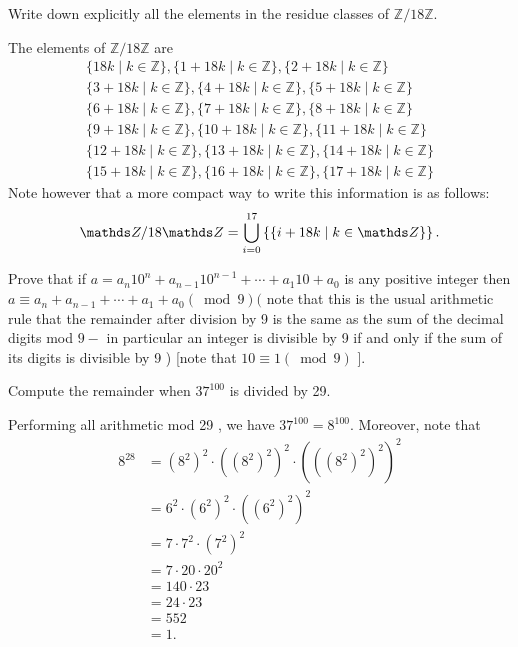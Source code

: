 \begin{questions}
\question
    Write down explicitly all the elements in the residue classes of \(\mathbb{Z} / 18 \mathbb{Z}\).
\begin{solution} The elements of \(\mathbb{Z} / 18 \mathbb{Z}\) are 
    $$\begin{gathered}
        \{18 k \mid k \in \mathbb{Z}\},\{1+18 k \mid k \in \mathbb{Z}\},\{2+18 k \mid k \in \mathbb{Z}\} \\
        \{3+18 k \mid k \in \mathbb{Z}\},\{4+18 k \mid k \in \mathbb{Z}\},\{5+18 k \mid k \in \mathbb{Z}\} \\
        \{6+18 k \mid k \in \mathbb{Z}\},\{7+18 k \mid k \in \mathbb{Z}\},\{8+18 k \mid k \in \mathbb{Z}\} \\
        \{9+18 k \mid k \in \mathbb{Z}\},\{10+18 k \mid k \in \mathbb{Z}\},\{11+18 k \mid k \in \mathbb{Z}\} \\
        \{12+18 k \mid k \in \mathbb{Z}\},\{13+18 k \mid k \in \mathbb{Z}\},\{14+18 k \mid k \in \mathbb{Z}\} \\
        \{15+18 k \mid k \in \mathbb{Z}\},\{16+18 k \mid k \in \mathbb{Z}\},\{17+18 k \mid k \in \mathbb{Z}\}
        \end{gathered}$$
    Note however that a more compact way to write this information is as follows: \[
        \Z/18\Z = \bigcup_{i=0}^{17} \left\{ \{i+18k \mid k\in \Z\} \right\}.
    \]
\end{solution}

\question
    Prove that if \(a=a_n 10^n+a_{n-1} 10^{n-1}+\cdots+a_1 10+a_0\) is any positive integer then \(a \equiv a_n+a_{n-1}+\cdots+a_1+a_0(\bmod 9)(\) note that this is the usual arithmetic rule that the remainder after division by 9 is the same as the sum of the decimal digits mod \(9-\) in particular an integer is divisible by 9 if and only if the sum of its digits is divisible by 9 ) [note that \(10 \equiv 1(\bmod 9)\) ].


\begin{solution}
    
\end{solution}

\question
    Compute the remainder when \(37^{100}\) is divided by 29.

\begin{solution}
    Performing all arithmetic mod 29 , we have \(37^{100}=8^{100}\). Moreover, note that
\[
\begin{aligned}
8^{28} & =\left(8^2\right)^2 \cdot\left(\left(8^2\right)^2\right)^2 \cdot\left(\left(\left(8^2\right)^2\right)^2\right)^2 \\
& =6^2 \cdot\left(6^2\right)^2 \cdot\left(\left(6^2\right)^2\right)^2 \\
& =7 \cdot 7^2 \cdot\left(7^2\right)^2 \\
& =7 \cdot 20 \cdot 20^2 \\
& =140 \cdot 23 \\
& =24 \cdot 23 \\
& =552 \\
& =1 .
\end{aligned}
\]


\end{solution}
\end{questions}
